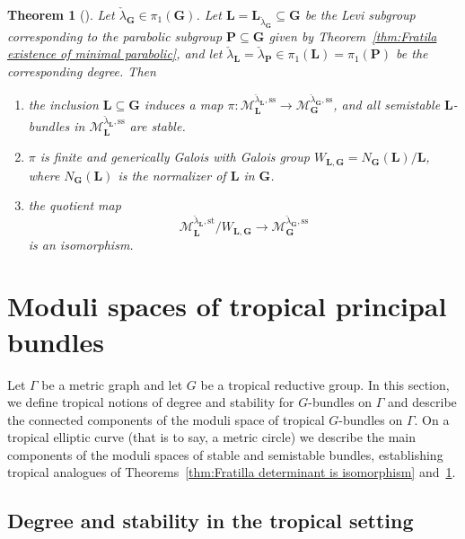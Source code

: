 \documentclass[10pt, a4paper]{amsart}
\newtheorem{theorem}{Theorem}[section]
\theoremstyle{definition}
\theoremstyle{myitemstyle}
\newcommand{\lambdacheck}{\check{\lambda}}
\newcommand{\bfG}{\mathbf{G}}
\newcommand{\bfL}{\mathbf{L}}
\newcommand{\bfP}{\mathbf{P}}
\newcommand{\mc}[1]{{\mathcal{#1}}}
\newcommand{\st}{\mathrm{st}}
\newcommand{\semist}{\mathrm{ss}}
\newcommand{\Ga}{\Gamma}
\begin{document}
\begin{theorem}[{\cite[Theorem 1.2]{Fratila_revisitingelliptic}}]
\label{thm:Fratilas results}
Let $\lambdacheck_\bfG\in \pi_1(\bfG)$. Let  $\bfL = \bfL_{\lambdacheck_\bfG}\subseteq \bfG$ be the Levi subgroup corresponding to the parabolic subgroup $\bfP\subseteq \bfG$ given by Theorem~\ref{thm:Fratila existence of minimal parabolic}, and let $\lambdacheck_\bfL=\lambdacheck_\bfP\in \pi_1(\bfL)=\pi_1(\bfP)$ be the corresponding degree. Then
\begin{enumerate}
    \item the inclusion $\bfL\subseteq \bfG$ induces a map $\pi\colon\mc M_\bfL^{\lambdacheck_\bfL,\semist}\to \mc M_\bfG^{\lambdacheck_\bfG,\semist}$, and all semistable $\bfL$-bundles in $\mc M_\bfL^{\lambdacheck_\bfL,\semist}$ are stable. 
    \item $\pi$ is finite and generically Galois with Galois group $W_{\bfL,\bfG}=N_\bfG(\bfL)/\bfL$, where $N_\bfG(\bfL)$ is the normalizer of $\bfL$ in $\bfG$. 
    \item the quotient map
    \[
        \mc M_\bfL^{\lambdacheck_\bfL,\st}/W_{\bfL,\bfG}\to \mc M_{\bfG}^{\lambdacheck_\bfG,\semist}
    \]
    is an isomorphism. 
   \end{enumerate}
\end{theorem}











\section{Moduli spaces of tropical principal bundles}

\label{sec:moduliofbundles}



Let $\Ga$ be a metric graph and let $G$ be a tropical reductive group. In this section, we define tropical notions of degree and stability for $G$-bundles on $\Ga$ and describe the connected components of the moduli space of tropical $G$-bundles on $\Ga$. On a tropical elliptic curve (that is to say, a metric circle) we describe the main components of the moduli spaces of stable and semistable bundles, establishing tropical analogues of Theorems~\ref{thm:Fratilla determinant is isomorphism} and~\ref{thm:Fratilas results}.

\subsection{Degree and stability in the tropical setting}
\end{document}
